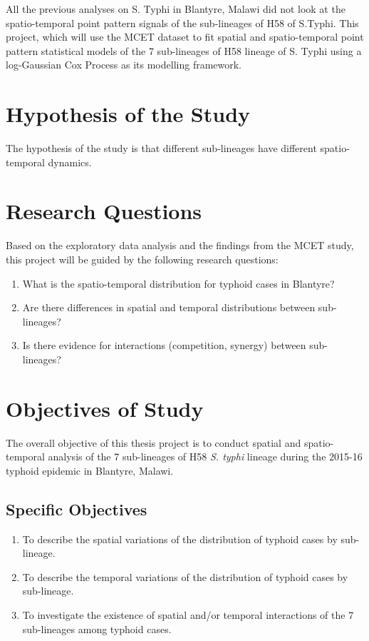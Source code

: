 \documentclass[12pt,a4paper]{report}
\begin{document}
All the previous analyses on S. Typhi in Blantyre, Malawi did not look at the spatio-temporal point pattern signals of the sub-lineages of H58 of S.Typhi. This project, which will use the MCET dataset to fit spatial and spatio-temporal point pattern statistical models of the 7 sub-lineages of H58 lineage of S. Typhi using a log-Gaussian Cox Process as its modelling framework.

\section{Hypothesis of the Study}

The hypothesis of the study is that different sub-lineages have different spatio-temporal dynamics.

\section{Research Questions}

Based on the exploratory data analysis and the findings from the MCET study, this project will be guided by the following research questions:

\begin{enumerate}
\item What is the spatio-temporal distribution for typhoid cases in Blantyre?
\item Are there differences in spatial and temporal distributions between sub-lineages?
\item Is there evidence for interactions (competition, synergy) between sub-lineages?
\end{enumerate}

\section{Objectives of Study}

The overall objective of this thesis project is to conduct spatial and spatio-temporal analysis of the 7 sub-lineages of H58 \textit{S. typhi} lineage during the 2015-16 typhoid epidemic in Blantyre, Malawi.

\subsection{Specific Objectives}

\begin{enumerate}
\item To describe the spatial variations of the distribution of typhoid cases by sub-lineage.

\item To describe the temporal variations of the distribution of typhoid cases by sub-lineage.

\item To investigate the existence of spatial and/or temporal interactions of the 7 sub-lineages among typhoid cases.

\end{enumerate}
\end{document}
